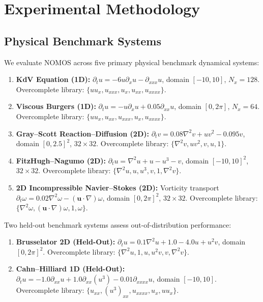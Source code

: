 \documentclass[twocolumn,10pt,a4paper]{article}
\begin{document}
\section{Experimental Methodology}

\subsection{Physical Benchmark Systems}
We evaluate NOMOS across five primary physical benchmark dynamical systems:
\begin{enumerate}
    \item \textbf{KdV Equation (1D):} $\partial_t u = -6 u \partial_x u - \partial_{xxx} u$, domain $[-10, 10]$, $N_x=128$. Overcomplete library: $\{u u_x, u_{xxx}, u_x, u_{xx}, u_{xxxx}\}$.
    \item \textbf{Viscous Burgers (1D):} $\partial_t u = -u \partial_x u + 0.05 \partial_{xx} u$, domain $[0, 2\pi]$, $N_x=64$. Overcomplete library: $\{u u_x, u_{xx}, u_{xxx}, u_x, u_{xxxx}\}$.
    \item \textbf{Gray--Scott Reaction--Diffusion (2D):} $\partial_t v = 0.08 \nabla^2 v + u v^2 - 0.095 v$, domain $[0, 2.5]^2$, $32 \times 32$. Overcomplete library: $\{\nabla^2 v, u v^2, v, u, 1\}$.
    \item \textbf{FitzHugh--Nagumo (2D):} $\partial_t u = \nabla^2 u + u - u^3 - v$, domain $[-10, 10]^2$, $32 \times 32$. Overcomplete library: $\{\nabla^2 u, u, u^3, v, 1, \nabla^2 v\}$.
    \item \textbf{2D Incompressible Navier--Stokes (2D):} Vorticity transport $\partial_t \omega = 0.02 \nabla^2 \omega - (\mathbf{u} \cdot \nabla)\omega$, domain $[0, 2\pi]^2$, $32 \times 32$. Overcomplete library: $\{\nabla^2 \omega, (\mathbf{u} \cdot \nabla)\omega, 1, \omega\}$.
\end{enumerate}
Two held-out benchmark systems assess out-of-distribution performance:
\begin{enumerate}
    \item \textbf{Brusselator 2D (Held-Out):} $\partial_t u = 0.1 \nabla^2 u + 1.0 - 4.0 u + u^2 v$, domain $[0, 2\pi]^2$. Overcomplete library: $\{\nabla^2 u, 1, u, u^2 v, v, \nabla^2 v\}$.
    \item \textbf{Cahn--Hilliard 1D (Held-Out):} $\partial_t u = -1.0 \partial_{xx} u + 1.0 \partial_{xx}(u^3) - 0.01 \partial_{xxxx} u$, domain $[-10, 10]$. Overcomplete library: $\{u_{xx}, (u^3)_{xx}, u_{xxxx}, u_x, u u_x\}$.
\end{enumerate}
\end{document}
